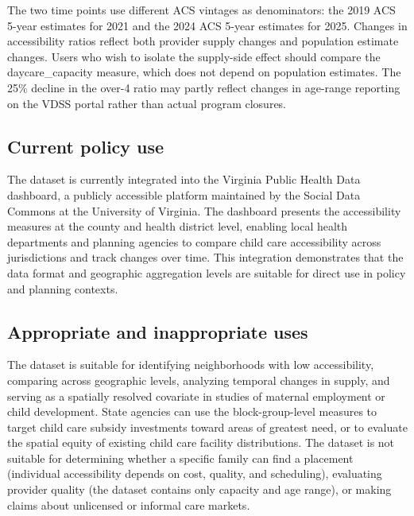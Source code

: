 \documentclass{CUP-JNL-DAP}%
\begin{document}
The two time points use different ACS vintages as denominators: the 2019 ACS 5-year estimates for 2021 and the 2024 ACS 5-year estimates for 2025. Changes in accessibility ratios reflect both provider supply changes and population estimate changes. Users who wish to isolate the supply-side effect should compare the daycare\_capacity measure, which does not depend on population estimates. The 25\% decline in the over-4 ratio may partly reflect changes in age-range reporting on the VDSS portal rather than actual program closures.

\subsection{Current policy use}

The dataset is currently integrated into the Virginia Public Health Data dashboard, a publicly accessible platform maintained by the Social Data Commons at the University of Virginia. The dashboard presents the accessibility measures at the county and health district level, enabling local health departments and planning agencies to compare child care accessibility across jurisdictions and track changes over time. This integration demonstrates that the data format and geographic aggregation levels are suitable for direct use in policy and planning contexts.

\subsection{Appropriate and inappropriate uses}

The dataset is suitable for identifying neighborhoods with low accessibility, comparing across geographic levels, analyzing temporal changes in supply, and serving as a spatially resolved covariate in studies of maternal employment or child development. State agencies can use the block-group-level measures to target child care subsidy investments toward areas of greatest need, or to evaluate the spatial equity of existing child care facility distributions. The dataset is not suitable for determining whether a specific family can find a placement (individual accessibility depends on cost, quality, and scheduling), evaluating provider quality (the dataset contains only capacity and age range), or making claims about unlicensed or informal care markets.

\end{document}
